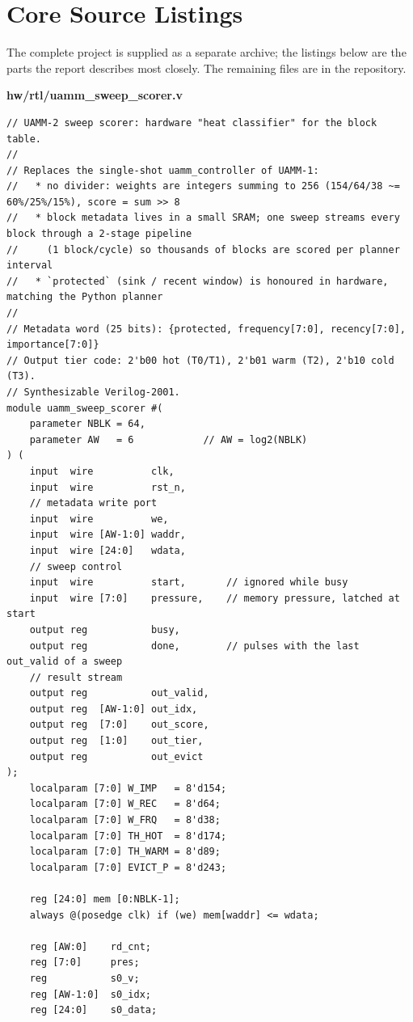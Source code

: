 \documentclass[12pt,a4paper]{report}
\begin{document}
\chapter{Core Source Listings}\label{app:listings}
The complete project is supplied as a separate archive; the listings below are the parts the report describes most closely. The remaining files are in the repository.

\par\smallskip\noindent\textbf{hw/rtl/uamm\_\allowbreak{}sweep\_\allowbreak{}scorer.v}\par\nopagebreak
\begin{lstlisting}
// UAMM-2 sweep scorer: hardware "heat classifier" for the block table.
//
// Replaces the single-shot uamm_controller of UAMM-1:
//   * no divider: weights are integers summing to 256 (154/64/38 ~= 60%/25%/15%), score = sum >> 8
//   * block metadata lives in a small SRAM; one sweep streams every block through a 2-stage pipeline
//     (1 block/cycle) so thousands of blocks are scored per planner interval
//   * `protected` (sink / recent window) is honoured in hardware, matching the Python planner
//
// Metadata word (25 bits): {protected, frequency[7:0], recency[7:0], importance[7:0]}
// Output tier code: 2'b00 hot (T0/T1), 2'b01 warm (T2), 2'b10 cold (T3).
// Synthesizable Verilog-2001.
module uamm_sweep_scorer #(
    parameter NBLK = 64,
    parameter AW   = 6            // AW = log2(NBLK)
) (
    input  wire          clk,
    input  wire          rst_n,
    // metadata write port
    input  wire          we,
    input  wire [AW-1:0] waddr,
    input  wire [24:0]   wdata,
    // sweep control
    input  wire          start,       // ignored while busy
    input  wire [7:0]    pressure,    // memory pressure, latched at start
    output reg           busy,
    output reg           done,        // pulses with the last out_valid of a sweep
    // result stream
    output reg           out_valid,
    output reg  [AW-1:0] out_idx,
    output reg  [7:0]    out_score,
    output reg  [1:0]    out_tier,
    output reg           out_evict
);
    localparam [7:0] W_IMP   = 8'd154;
    localparam [7:0] W_REC   = 8'd64;
    localparam [7:0] W_FRQ   = 8'd38;
    localparam [7:0] TH_HOT  = 8'd174;
    localparam [7:0] TH_WARM = 8'd89;
    localparam [7:0] EVICT_P = 8'd243;

    reg [24:0] mem [0:NBLK-1];
    always @(posedge clk) if (we) mem[waddr] <= wdata;

    reg [AW:0]    rd_cnt;
    reg [7:0]     pres;
    reg           s0_v;
    reg [AW-1:0]  s0_idx;
    reg [24:0]    s0_data;


\end{lstlisting}
\end{document}
